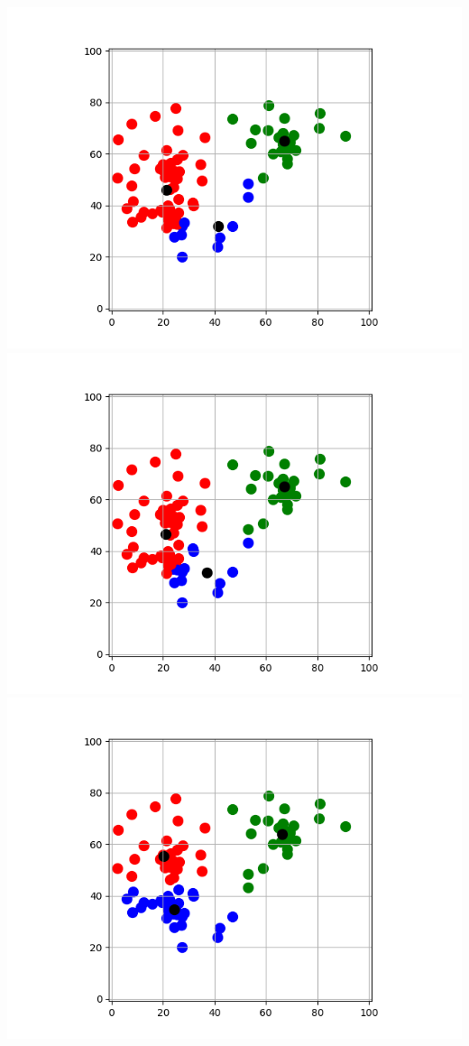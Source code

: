 \documentclass[10pt,class=report,crop=false]{standalone}
\begin{document}
\begin{activite}[Barycentres]
\begin{enumerate}
\begin{center}
	\end{center}	
	\begin{center}
	\includegraphics[scale=\myscale,scale=0.32]{ecran_barycentres_exemple_05}
	\includegraphics[scale=\myscale,scale=0.32]{ecran_barycentres_exemple_06}
	\includegraphics[scale=\myscale,scale=0.32]{ecran_barycentres_exemple_09}
	\end{center}	


\end{enumerate}
\end{activite}
\end{document}
